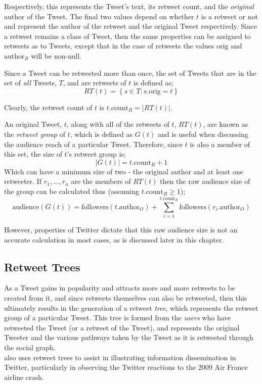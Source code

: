 Respectively, this represents the Tweet's text, its retweet count, and the \textit{original} author of the Tweet. The final two values depend on whether $t$ is a retweet or not and represent the author of the retweet and the original Tweet respectively. Since a retweet remains a class of Tweet, then the same properties can be assigned to retweets as to Tweets, except that in the case of retweets the values $\mathrm{orig}$ and $\mathrm{author}_R$ will be non-null.

Since a Tweet can be retweeted more than once, the set of Tweets that are in the set of \textit{all} Tweets, $T$, and are retweets of $t$ is defined as;
\[
	RT(t) = \left\{ s \in T : s.\textrm{orig} = t \right\}
\]

Clearly, the retweet count of $t$ is $ t.\mathrm{count}_R = \left\vert{RT(t)}\right\vert $.

An original Tweet, $t$, along with all of the retweets of $t$, $RT(t)$, are known as the \textit{retweet group} of $t$, which is defined as $G(t)$ and is useful when discussing the audience reach of a particular Tweet. Therefore, since $t$ is also a member of this set, the size of $t$'s retweet group is; 
\[
	\left\vert{G(t)}\right\vert = t.\mathrm{count}_R + 1 
\] 
Which can have a minimum size of two - the original author and at least one retweeter. If $ r_1,...,r_n $ are the members of $RT(t)$ then the raw audience size of the group can be calculated thus (assuming $t.\textrm{count}_R \geq 1$);
\[
	\textrm{audience}(G(t)) = \textrm{followers}(t.\textrm{author}_O) + \sum\limits_{i=1}^{t.\mathrm{count}_R} \textrm{followers}(r_i.\textrm{author}_O)
\]

However, properties of Twitter dictate that this raw audience size is not an accurate calculation in most cases, as is discussed later in this chapter.


\subsection{Retweet Trees}
As a Tweet gains in popularity and attracts more and more retweets to be created from it, and since retweets themselves can also be retweeted, then this ultimately results in the generation of a retweet \textit{tree}, which represents the retweet group of a particular Tweet. This tree is formed from the \textit{users} who have retweeted the Tweet (or a retweet of the Tweet), and represents the original Tweeter and the various pathways taken by the Tweet as it is retweeted through the social graph.\\
\cite{kwak10} also uses retweet trees to assist in illustrating information dissemination in Twitter, particularly in observing the Twitter reactions to the 2009 Air France airline crash.

